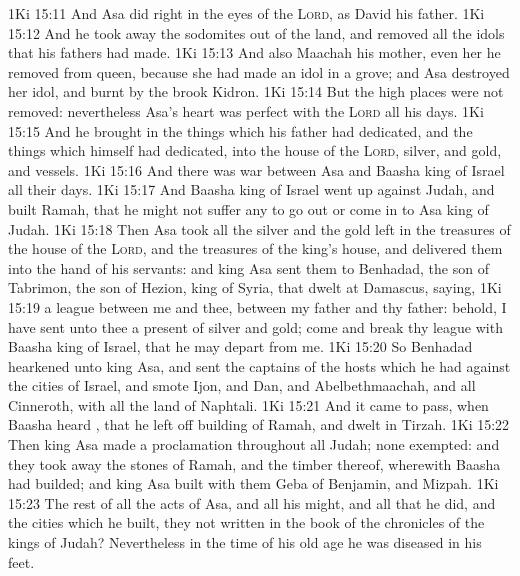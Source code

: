 \vs 1Ki 15:11 And Asa did  right in the eyes of the \textsc{Lord}, as  David his father.
\vs 1Ki 15:12 And he took away the sodomites out of the land, and removed all the idols that his fathers had made.
\vs 1Ki 15:13 And also Maachah his mother, even her he removed from  queen, because she had made an idol in a grove; and Asa destroyed her idol, and burnt  by the brook Kidron.
\vs 1Ki 15:14 But the high places were not removed: nevertheless Asa's heart was perfect with the \textsc{Lord} all his days.
\vs 1Ki 15:15 And he brought in the things which his father had dedicated, and the things which himself had dedicated, into the house of the \textsc{Lord}, silver, and gold, and vessels.
\vs 1Ki 15:16 And there was war between Asa and Baasha king of Israel all their days.
\vs 1Ki 15:17 And Baasha king of Israel went up against Judah, and built Ramah, that he might not suffer any to go out or come in to Asa king of Judah.
\vs 1Ki 15:18 Then Asa took all the silver and the gold  left in the treasures of the house of the \textsc{Lord}, and the treasures of the king's house, and delivered them into the hand of his servants: and king Asa sent them to Benhadad, the son of Tabrimon, the son of Hezion, king of Syria, that dwelt at Damascus, saying,
\vs 1Ki 15:19  a league between me and thee,  between my father and thy father: behold, I have sent unto thee a present of silver and gold; come and break thy league with Baasha king of Israel, that he may depart from me.
\vs 1Ki 15:20 So Benhadad hearkened unto king Asa, and sent the captains of the hosts which he had against the cities of Israel, and smote Ijon, and Dan, and Abelbethmaachah, and all Cinneroth, with all the land of Naphtali.
\vs 1Ki 15:21 And it came to pass, when Baasha heard , that he left off building of Ramah, and dwelt in Tirzah.
\vs 1Ki 15:22 Then king Asa made a proclamation throughout all Judah; none  exempted: and they took away the stones of Ramah, and the timber thereof, wherewith Baasha had builded; and king Asa built with them Geba of Benjamin, and Mizpah.
\vs 1Ki 15:23 The rest of all the acts of Asa, and all his might, and all that he did, and the cities which he built,  they not written in the book of the chronicles of the kings of Judah? Nevertheless in the time of his old age he was diseased in his feet.
